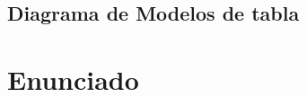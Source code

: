 \documentclass[a4paper,10pt]{article}
\begin{document}
  \subsection{Diagrama de Modelos de tabla}
    \begin{flushleft}
    \end{flushleft}

\appendix
\newpage
\section{Enunciado}
  
\end{document}
